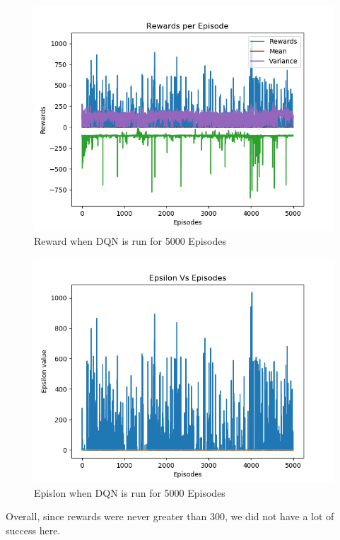 \documentclass[doc, onecolumn, 12pt]{apa6}
\begin{document}
\begin{figure}
\label{DQN_5000Ep_Rewards}
\includegraphics[width =\textwidth, height=0.4 \textheight]{results/dqn/5000_ep/Rewards.png}
\caption{Reward  when DQN is run for 5000 Episodes}
\end{figure}

\begin{figure}
\label{DQN_5000Ep_Epsilon}
\includegraphics[width =\textwidth, height=0.4 \textheight]{results/dqn/5000_ep/Epsilon.png}
\caption{Epislon when DQN is run for 5000 Episodes}
\end{figure}


Overall, since rewards were never greater than 300, we did not have a lot of success here. 
\FloatBarrier
\end{document}
